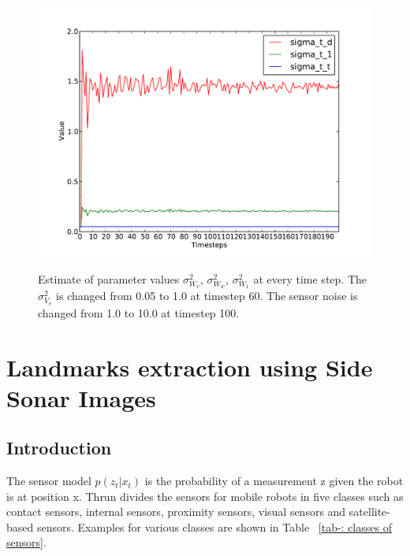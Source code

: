 \documentclass[12pt]{dalcsthesis}
\begin{document}
\begin{figure}
  \centering
     {\includegraphics[height = 3.0 in]{./plots/200_005_05_s_10_100_100_traj_3_trial_1_motion_model_rotation.pdf}}
  \caption{\label{fig-different sensor noise motion model rotation}Estimate of parameter values $\sigma_{W_{v}}^{2}$, $\sigma_{W_{w}}^{2}$, $\sigma_{W_{1}}^{2}$ at every time step. The $\sigma_{V_{v}}^{2}$ is changed from 0.05 to 1.0 at timestep 60. The sensor noise is changed from 1.0 to 10.0 at timestep 100.}
\end{figure}


\chapter{Landmarks extraction using Side Sonar Images}
\section{Introduction}
The sensor model $p(z_{t}|x_{t})$ is the probability of a measurement z given the robot is at position x. Thrun \cite{thrun2005probabilistic} divides the sensors for mobile robots in five classes such as contact sensors, internal sensors, proximity sensors, visual sensors and satellite-based sensors. Examples for various classes are shown in Table ~\ref{tab-: classes of sensors}.
\end{document}
